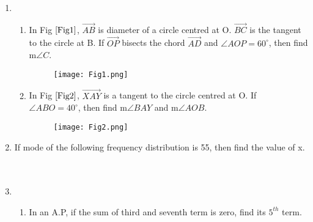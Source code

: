 \begin{enumerate}[\arabic*]

\item     
 \begin{enumerate}
  \item In Fig $\ref{Fig1}$, $\Vec{AB}$ is diameter of a circle centred at O. $\Vec{BC}$ is the tangent to the circle at B. If $\Vec{OP}$ bisects the chord $\Vec{AD}$ and  $\angle{AOP} = 60^\circ$, then find m$\angle{C}$.


   \begin{figure}[h!]
     \centering
     \texttt{[image: Fig1.png]}
	 \caption{}
	 \label{Fig1}
	 
    \end{figure}

   \item In Fig $\ref{Fig2}$, $\Vec{XAY}$ is a tangent to the circle centred at O. If $\angle{ABO} = 40^\circ$, then find m$\angle{BAY}$ and m$\angle{AOB}$.


    \begin{figure}[h!]
     \centering
     \texttt{[image: Fig2.png]}
	 \caption{}
	 \label{Fig2}
    \end{figure}

\end{enumerate}

\item If mode of the following frequency distribution is 55, then find the value of x. \\
     \vspace{2mm}\\
     \vspace{5mm} \\
     

\item 
\begin{enumerate} 
   \item In an A.P,  if the sum of third and seventh term is zero, find its $5^{th}$ term. \\

   \vspace{3mm} \\


\end{enumerate}
\end{enumerate}
